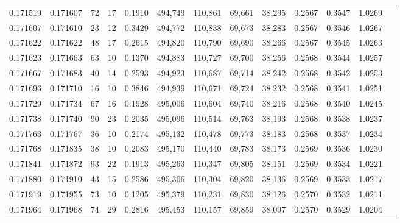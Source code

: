 \begin{tabular}{rrrrrrrrrrrrr}
0.171519 & 0.171607 &    72 &  17 &                                     0.1910 & 494,749 & 110,861 &  69,661 &  38,295 & 0.2567 & 0.3547 & 1.0269 \\
0.171607 & 0.171610 &    23 &  12 &                                     0.3429 & 494,772 & 110,838 &  69,673 &  38,283 & 0.2567 & 0.3546 & 1.0267 \\
0.171622 & 0.171622 &    48 &  17 &                                     0.2615 & 494,820 & 110,790 &  69,690 &  38,266 & 0.2567 & 0.3545 & 1.0263 \\
0.171623 & 0.171663 &    63 &  10 &                                     0.1370 & 494,883 & 110,727 &  69,700 &  38,256 & 0.2568 & 0.3544 & 1.0257 \\
0.171667 & 0.171683 &    40 &  14 &                                     0.2593 & 494,923 & 110,687 &  69,714 &  38,242 & 0.2568 & 0.3542 & 1.0253 \\
0.171696 & 0.171710 &    16 &  10 &                                     0.3846 & 494,939 & 110,671 &  69,724 &  38,232 & 0.2568 & 0.3541 & 1.0251 \\
0.171729 & 0.171734 &    67 &  16 &                                     0.1928 & 495,006 & 110,604 &  69,740 &  38,216 & 0.2568 & 0.3540 & 1.0245 \\
0.171738 & 0.171740 &    90 &  23 &                                     0.2035 & 495,096 & 110,514 &  69,763 &  38,193 & 0.2568 & 0.3538 & 1.0237 \\
0.171763 & 0.171767 &    36 &  10 &                                     0.2174 & 495,132 & 110,478 &  69,773 &  38,183 & 0.2568 & 0.3537 & 1.0234 \\
0.171768 & 0.171835 &    38 &  10 &                                     0.2083 & 495,170 & 110,440 &  69,783 &  38,173 & 0.2569 & 0.3536 & 1.0230 \\
0.171841 & 0.171872 &    93 &  22 &                                     0.1913 & 495,263 & 110,347 &  69,805 &  38,151 & 0.2569 & 0.3534 & 1.0221 \\
0.171880 & 0.171910 &    43 &  15 &                                     0.2586 & 495,306 & 110,304 &  69,820 &  38,136 & 0.2569 & 0.3533 & 1.0217 \\
0.171919 & 0.171955 &    73 &  10 &                                     0.1205 & 495,379 & 110,231 &  69,830 &  38,126 & 0.2570 & 0.3532 & 1.0211 \\
0.171964 & 0.171968 &    74 &  29 &                                     0.2816 & 495,453 & 110,157 &  69,859 &  38,097 & 0.2570 & 0.3529 & 1.0204 \\

\end{tabular}
